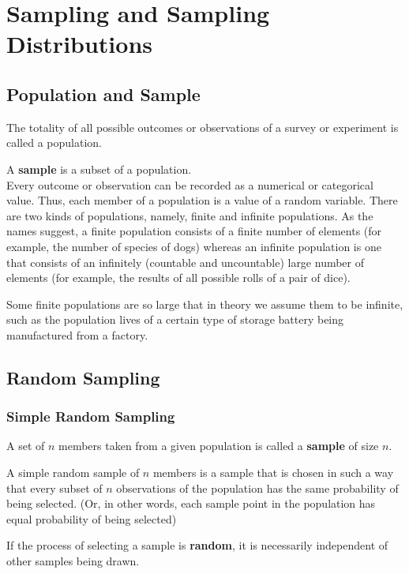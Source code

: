\chapter{Sampling and Sampling Distributions}

\section{Population and Sample}

\begin{definition}[Population]
The totality of all possible outcomes or observations of a survey or experiment is called a population.
\end{definition}
A \textbf{sample} is a subset of a population. \\
Every outcome or observation can be recorded as a numerical or categorical value. Thus, each member of a population is a value of a random variable. There are two kinds of populations, namely, finite and infinite populations.
As the names suggest, a finite population consists of a finite number of elements (for example, the number of species of dogs) whereas an infinite population is one that consists of an infinitely (countable and uncountable) large number of elements (for example, the results of all possible rolls of a pair of dice).

\begin{note}
\end{note}
Some finite populations are so large that in theory we assume them to be infinite, such as the population lives of a certain type of storage battery being manufactured from a factory.

\section{Random Sampling}

\subsection{Simple Random Sampling}
A set of $n$ members taken from a given population is called a \textbf{sample} of size $n$.
\begin{definition}
A simple random sample of $n$ members is a sample that is chosen in such a way that every subset of $n$ observations of the population has the same probability of being selected. (Or, in other words, each sample point in the population has equal probability of being selected)
\end{definition}
If the process of selecting a sample is \textbf{random}, it is necessarily independent of other samples being drawn.
